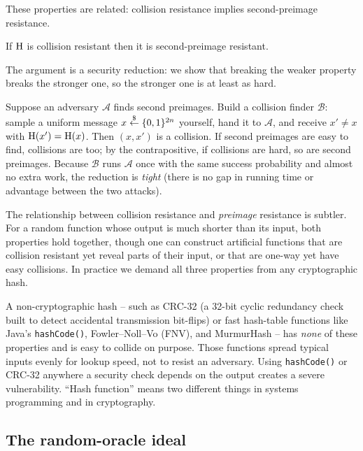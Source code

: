These properties are related: collision resistance implies second-preimage resistance.

\begin{proposition}
\label{ch14:cr-implies-spr}
If $\operatorname{H}$ is collision resistant then it is second-preimage resistant.
\end{proposition}

\begin{whybox}
The argument is a security reduction: we show that breaking the weaker property breaks the stronger one, so the stronger one is at least as hard.

Suppose an adversary $\mathcal{A}$ finds second preimages. Build a collision finder $\mathcal{B}$: sample a uniform message $x \stackrel{\$}{\gets} \{0,1\}^{2n}$ yourself, hand it to $\mathcal{A}$, and receive $x' \ne x$ with $\operatorname{H}(x') = \operatorname{H}(x)$. Then $(x, x')$ is a collision. If second preimages are easy to find, collisions are too; by the contrapositive, if collisions are hard, so are second preimages. Because $\mathcal{B}$ runs $\mathcal{A}$ once with the same success probability and almost no extra work, the reduction is \emph{tight} (there is no gap in running time or advantage between the two attacks).
\end{whybox}

The relationship between collision resistance and \emph{preimage} resistance is subtler. For a random function whose output is much shorter than its input, both properties hold together, though one can construct artificial functions that are collision resistant yet reveal parts of their input, or that are one-way yet have easy collisions. In practice we demand all three properties from any cryptographic hash.

\begin{trapbox}
A non-cryptographic hash -- such as CRC-32 (a 32-bit cyclic redundancy check built to detect accidental transmission bit-flips) or fast hash-table functions like Java's \texttt{hashCode()}, Fowler--Noll--Vo (FNV), and MurmurHash -- has \emph{none} of these properties and is easy to collide on purpose. Those functions spread typical inputs evenly for lookup speed, not to resist an adversary. Using \texttt{hashCode()} or CRC-32 anywhere a security check depends on the output creates a severe vulnerability. ``Hash function'' means two different things in systems programming and in cryptography.
\end{trapbox}

\subsection{The random-oracle ideal}

